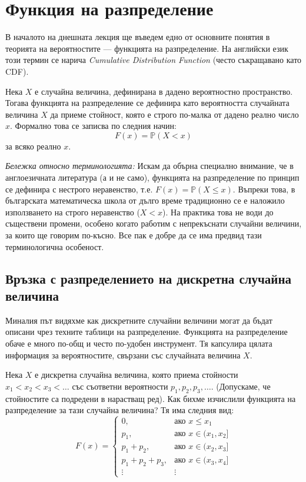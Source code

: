 \documentclass{article}
\begin{document}
\section{Функция на разпределение}

В началото на днешната лекция ще въведем едно от основните понятия в теорията на вероятностите — функцията на разпределение. На английски език този термин се нарича \textit{Cumulative Distribution Function} (често съкращавано като CDF). 

Нека $X$ е случайна величина, дефинирана в дадено вероятностно пространство. Тогава функцията на разпределение се дефинира като вероятността случайната величина $X$ да приеме стойност, която е строго по-малка от дадено реално число $x$. Формално това се записва по следния начин:
\[ F(x) = \mathbb{P}(X < x) \]
за всяко реално $x$.

\textit{Бележка относно терминологията:} Искам да обърна специално внимание, че в англоезичната литература (а и не само), функцията на разпределение по принцип се дефинира с нестрого неравенство, т.е. $F(x) = \mathbb{P}(X \le x)$. Въпреки това, в българската математическа школа от дълго време традиционно се е наложило използването на строго неравенство ($X < x$). На практика това не води до съществени промени, особено когато работим с непрекъснати случайни величини, за които ще говорим по-късно. Все пак е добре да се има предвид тази терминологична особеност.

\subsection{Връзка с разпределението на дискретна случайна величина}

Миналия път видяхме как дискретните случайни величини могат да бъдат описани чрез техните таблици на разпределение. Функцията на разпределение обаче е много по-общ и често по-удобен инструмент. Тя капсулира цялата информация за вероятностите, свързани със случайната величина $X$.

Нека $X$ е дискретна случайна величина, която приема стойности $x_1 < x_2 < x_3 < \dots$ със съответни вероятности $p_1, p_2, p_3, \dots$. (Допускаме, че стойностите са подредени в нарастващ ред).
Как бихме изчислили функцията на разпределение за тази случайна величина?
Тя има следния вид:
\[
F(x) =
\begin{cases}
0, & \text{ако } x \le x_1 \\
p_1, & \text{ако } x \in (x_1, x_2] \\
p_1 + p_2, & \text{ако } x \in (x_2, x_3] \\
p_1 + p_2 + p_3, & \text{ако } x \in (x_3, x_4] \\
\vdots & \vdots
\end{cases}
\]
\end{document}
